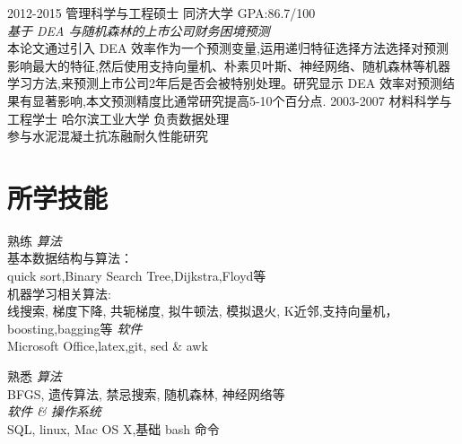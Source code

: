 \documentclass[print]{friggeri-cv} %
\begin{document}
\begin{entrylist}
\entry
{2012-2015}
{ {\normalfont 管理科学与工程}硕士}
{同济大学}
{GPA:86.7/100\\
\emph{基于 DEA 与随机森林的上市公司财务困境预测} \\
本论文通过引入 DEA 效率作为一个预测变量,运用递归特征选择方法选择对预测影响最大的特征,然后使用支持向量机、朴素贝叶斯、神经网络、随机森林等机器学习方法,来预测上市公司2年后是否会被特别处理。研究显示 DEA 效率对预测结果有显著影响,本文预测精度比通常研究提高5-10个百分点.}
\entry
{2003-2007}
{{\normalfont 材料科学与工程}学士}
{哈尔滨工业大学}
{负责数据处理\\
参与水泥混凝土抗冻融耐久性能研究}
\end{entrylist}




\section{所学技能}
\begin{entrylist}

\entry
{}
{熟练}
{}
{\emph{算法}\\
基本数据结构与算法：\\
quick sort,Binary Search Tree,Dijkstra,Floyd等\\
机器学习相关算法:\\
线搜索, 梯度下降, 共轭梯度, 拟牛顿法, 模拟退火,  K近邻,支持向量机，boosting,bagging等
\emph{软件}\\%
 Microsoft Office,latex,git, sed \& awk}



\entry
{}
{熟悉}
{}
{\emph{算法}\\
BFGS, 遗传算法, 禁忌搜索, 随机森林, 神经网络等\\ %
\emph{软件 \& 操作系统}\\
SQL, linux, Mac OS X,基础 bash 命令
}

\end{entrylist}




\end{document}
